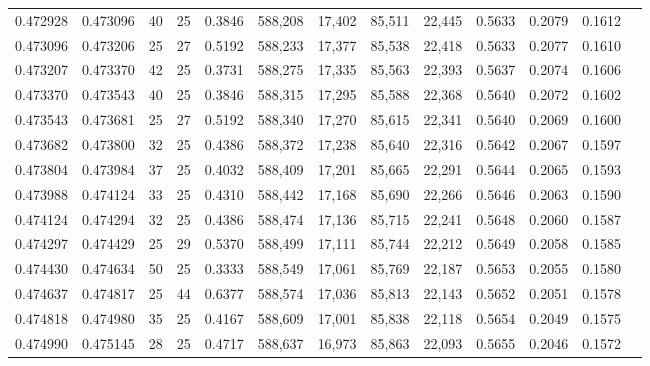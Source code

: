 \begin{tabular}{rrrrrrrrrrrrr}
0.472928 & 0.473096 &    40 &  25 &                                     0.3846 & 588,208 &  17,402 &  85,511 &  22,445 & 0.5633 & 0.2079 & 0.1612 \\
0.473096 & 0.473206 &    25 &  27 &                                     0.5192 & 588,233 &  17,377 &  85,538 &  22,418 & 0.5633 & 0.2077 & 0.1610 \\
0.473207 & 0.473370 &    42 &  25 &                                     0.3731 & 588,275 &  17,335 &  85,563 &  22,393 & 0.5637 & 0.2074 & 0.1606 \\
0.473370 & 0.473543 &    40 &  25 &                                     0.3846 & 588,315 &  17,295 &  85,588 &  22,368 & 0.5640 & 0.2072 & 0.1602 \\
0.473543 & 0.473681 &    25 &  27 &                                     0.5192 & 588,340 &  17,270 &  85,615 &  22,341 & 0.5640 & 0.2069 & 0.1600 \\
0.473682 & 0.473800 &    32 &  25 &                                     0.4386 & 588,372 &  17,238 &  85,640 &  22,316 & 0.5642 & 0.2067 & 0.1597 \\
0.473804 & 0.473984 &    37 &  25 &                                     0.4032 & 588,409 &  17,201 &  85,665 &  22,291 & 0.5644 & 0.2065 & 0.1593 \\
0.473988 & 0.474124 &    33 &  25 &                                     0.4310 & 588,442 &  17,168 &  85,690 &  22,266 & 0.5646 & 0.2063 & 0.1590 \\
0.474124 & 0.474294 &    32 &  25 &                                     0.4386 & 588,474 &  17,136 &  85,715 &  22,241 & 0.5648 & 0.2060 & 0.1587 \\
0.474297 & 0.474429 &    25 &  29 &                                     0.5370 & 588,499 &  17,111 &  85,744 &  22,212 & 0.5649 & 0.2058 & 0.1585 \\
0.474430 & 0.474634 &    50 &  25 &                                     0.3333 & 588,549 &  17,061 &  85,769 &  22,187 & 0.5653 & 0.2055 & 0.1580 \\
0.474637 & 0.474817 &    25 &  44 &                                     0.6377 & 588,574 &  17,036 &  85,813 &  22,143 & 0.5652 & 0.2051 & 0.1578 \\
0.474818 & 0.474980 &    35 &  25 &                                     0.4167 & 588,609 &  17,001 &  85,838 &  22,118 & 0.5654 & 0.2049 & 0.1575 \\
0.474990 & 0.475145 &    28 &  25 &                                     0.4717 & 588,637 &  16,973 &  85,863 &  22,093 & 0.5655 & 0.2046 & 0.1572 \\

\end{tabular}
